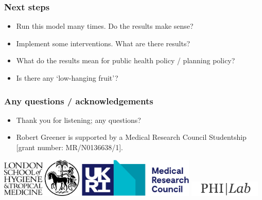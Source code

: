 \documentclass[aspectratio=169]{beamer}
\begin{document}
\begin{frame}
    \frametitle{Next steps}
    \begin{itemize}
        \item Run this model many times. Do the results make sense?
        \item Implement some interventions. What are there results?
        \item What do the results mean for public health policy / planning policy?
        \item Is there any `low-hanging fruit'?
    \end{itemize}
\end{frame}

\begin{frame}
    \frametitle{Any questions / acknowledgements}
    \begin{itemize}
        \item Thank you for listening; any questions?
        \item Robert Greener is supported by a Medical Research Council Studentship [grant number: MR/N0136638/1].
    \end{itemize}
    \vspace*{4em}
    \includegraphics[height=5em]{figures/LSHTM-logo-bw.jpg}
    \includegraphics[height=5em]{figures/Medical_Research_Council_logo.svg.png}
    \includegraphics[height=2em]{figures/philab.png}
\end{frame}
\end{document}
